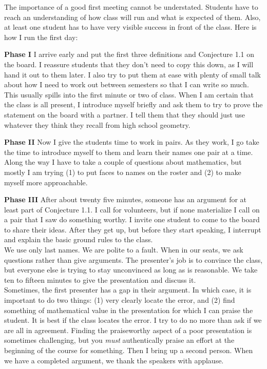\documentclass{tufte-handout}
\theoremstyle{definition}
\begin{document}
The importance of a good first meeting cannot be understated.
Students have to reach an understanding of how class will run and what is expected of them.
Also, at least one student has to have very visible success in front of the class.
Here is how I run the first day:\\[.1in]

\begin{compactdesc}
\item[\textbf{Phase I}] I arrive early and put the first three definitions and Conjecture 1.1 on the board.
I reassure students that they don't need to copy this down, as I will hand it out to them later.
I also try to put them at ease with plenty of small talk about how I need to work out between semesters so that I can write so much.
This usually spills into the first minute or two of class.
When I am certain that the class is all present, I introduce myself briefly and ask them to try to prove the statement on the board with a partner.
I tell them that they should just use whatever they think they recall from high school geometry.\\[.1in]

\item[\textbf{Phase II}] Now I give the students time to work in pairs.
As they work, I go take the time to introduce myself to them and learn their names one pair at a time.
Along the way I have to take a couple of questions about mathematics, but mostly I am trying (1) to put faces to names on the roster and (2) to make myself more approachable.\\[.1in]

\item[\textbf{Phase III}] After about twenty five minutes, someone has an argument for at least part of Conjecture 1.1.
I call for volunteers, but if none materialize I call on a pair that I saw do something worthy.
I invite one student to come to the board to share their ideas.
After they get up, but before they start speaking, I interrupt and explain the basic ground rules to the class.\\[.1in]

We use only last names.
We are polite to a fault.
When in our seats, we ask questions rather than give arguments.
The presenter's job is to convince the class, but everyone else is trying to stay unconvinced as long as is reasonable.
We take ten to fifteen minutes to give the presentation and discuss it.\\[.1in]

Sometimes, the first presenter has a gap in their argument. 
In which case, it is important to do two things: (1) very clearly locate the error, and (2) find something of mathematical value in the presentation for which I can praise the student.
It is best if the class locates the error.
I try to do no more than ask if we are all in agreement.
Finding the praiseworthy aspect of a poor presentation is sometimes challenging, but you \emph{must} authentically praise an effort at the beginning of the course for something.
Then I bring up a second person.
When we have a completed argument, we thank the speakers with applause.\\[.1in]


\end{compactdesc}
\end{document}
